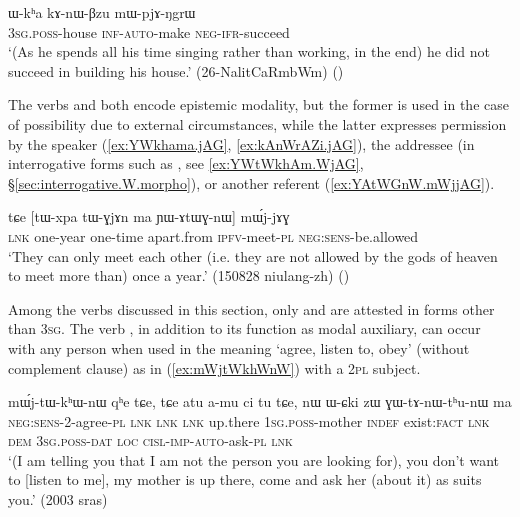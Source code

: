 \begin{exe} 
\ex \label{ex:kAnWBzu.mWpjANgrW}
\gll ɯ-kʰa kɤ-nɯ-βzu mɯ-pjɤ-ŋgrɯ \\
\textsc{3sg}.\textsc{poss}-house \textsc{inf}-\textsc{auto}-make \textsc{neg}-\textsc{ifr}-succeed \\
\glt `(As he spends all his time singing rather than working, in the end) he did not succeed in building his house.' (26-NalitCaRmbWm)
()
\end{exe}


The verbs  and  both encode epistemic modality, but the former is used in the case of possibility due to external circumstances, while the latter expresses permission by the speaker (\ref{ex:YWkhama.jAG}, \ref{ex:kAnWrAZi.jAG}), the addressee (in interrogative forms such as , see \ref{ex:YWtWkhAm.WjAG}, §\ref{sec:interrogative.W.morpho}), or another referent (\ref{ex:YAtWGnW.mWjjAG}). 


\begin{exe} 
\ex \label{ex:YAtWGnW.mWjjAG}
\gll tɕe [tɯ-xpa tɯ-ɣjɤn ma ɲɯ-ɤtɯɣ-nɯ] mɯ́j-jɤɣ \\
\textsc{lnk} one-year one-time apart.from \textsc{ipfv}-meet-\textsc{pl} \textsc{neg}:\textsc{sens}-be.allowed \\
\glt `They can only meet each other (i.e. they are not allowed by the gods of heaven to meet more than) once a year.' (150828 niulang-zh)
()
\end{exe}

Among the verbs discussed in this section, only  and  are attested in forms other than \textsc{3sg}. The verb , in addition to its function as modal auxiliary, can occur with any person when used in the meaning `agree, listen to, obey' (without complement clause) as in (\ref{ex:mWjtWkhWnW}) with a \textsc{2pl} subject.

\begin{exe} 
\ex \label{ex:mWjtWkhWnW}
\gll mɯ́j-tɯ-kʰɯ-nɯ qʰe tɕe, tɕe atu a-mu ci tu tɕe, nɯ ɯ-ɕki zɯ ɣɯ-tɤ-nɯ-tʰu-nɯ ma \\
\textsc{neg}:\textsc{sens}-2-agree-\textsc{pl} \textsc{lnk} \textsc{lnk} \textsc{lnk} up.there \textsc{1sg}.\textsc{poss}-mother \textsc{indef} exist:\textsc{fact} \textsc{lnk} \textsc{dem} \textsc{3sg}.\textsc{poss}-\textsc{dat} \textsc{loc} \textsc{cisl}-\textsc{imp}-\textsc{auto}-ask-\textsc{pl} \textsc{lnk} \\
\glt `(I am telling you that I am not the person you are looking for), you don't want to [listen to me], 
my mother is up there, come and ask her (about it) as suits you.' (2003 sras)
\end{exe} 

